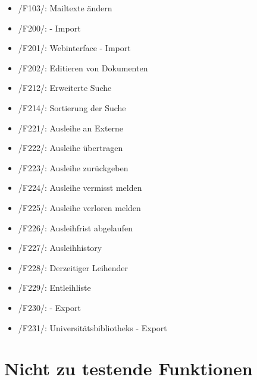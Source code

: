 
\begin{itemize}
\item /F103/: Mailtexte ändern %
\item /F200/: \BibTex - Import %
\item /F201/: Webinterface - Import 
\item /F202/: Editieren von Dokumenten 
\item /F212/: Erweiterte Suche %
\item /F214/: Sortierung der Suche %
\item /F221/: Ausleihe an Externe %
\item /F222/: Ausleihe übertragen %
\item /F223/: Ausleihe zurückgeben %
\item /F224/: Ausleihe vermisst melden %
\item /F225/: Ausleihe verloren melden %
\item /F226/: Ausleihfrist abgelaufen
\item /F227/: Ausleihhistory %
\item /F228/: Derzeitiger Leihender %
\item /F229/: Entleihliste %
\item /F230/: \BibTex - Export %
\item /F231/: Universitätsbibliotheks - Export %
\end{itemize}

\section{Nicht zu testende Funktionen}



